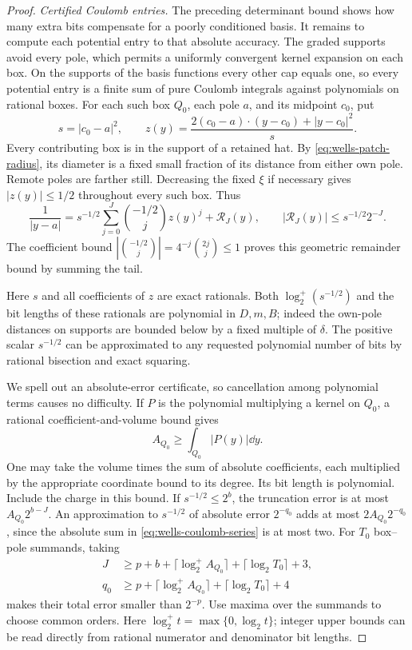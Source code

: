 \begin{proof}
\smallskip\noindent
\emph{Certified Coulomb entries.}
The preceding determinant bound shows how many extra bits compensate
for a poorly conditioned basis. It remains to compute each potential
entry to that absolute accuracy. The graded supports avoid every pole,
which permits a uniformly convergent kernel expansion on each box.
On the supports of the basis functions every other cap equals one,
so every potential entry is a finite sum of pure Coulomb integrals
against polynomials on rational boxes. For each such box \(Q_0\),
each pole \(a\), and its midpoint \(c_0\), put
\[
 s=|c_0-a|^2,\qquad
 z(y)=\frac{2(c_0-a)\cdot(y-c_0)+|y-c_0|^2}{s}.
\]
Every contributing box is in the support of a retained hat.
By \eqref{eq:wells-patch-radius}, its diameter is a fixed small
fraction of its distance from either own pole. Remote poles are
farther still. Decreasing the fixed \(\xi\) if necessary gives
\(|z(y)|\le1/2\) throughout every such box. Thus
\begin{equation}
 \frac1{|y-a|}
 =s^{-1/2}\sum_{j=0}^J\binom{-1/2}{j}z(y)^j
       +\mathcal R_J(y),\qquad
 |\mathcal R_J(y)|\le s^{-1/2}2^{-J}.
 \label{eq:wells-coulomb-series}
\end{equation}
The coefficient bound
\(\left|\binom{-1/2}{j}\right|
 =4^{-j}\binom{2j}{j}\le1\)
proves this geometric remainder bound by summing the tail.

Here \(s\) and all coefficients of \(z\) are exact rationals.
Both \(\log_2^+(s^{-1/2})\) and the bit lengths of these rationals are
polynomial in \(D,m,B\); indeed the own-pole distances on supports
are bounded below by a fixed multiple of \(\delta\).
The positive scalar \(s^{-1/2}\) can be approximated to any requested
polynomial number of bits by rational bisection and exact squaring.

We spell out an absolute-error certificate, so cancellation among
polynomial terms causes no difficulty. If \(P\) is the polynomial
multiplying a kernel on \(Q_0\), a rational coefficient-and-volume
bound gives
\[
 A_{Q_0}\ge\int_{Q_0}|P(y)|\dd y.
\]
One may take the volume times the sum of absolute coefficients,
each multiplied by the appropriate coordinate bound to its degree.
Its bit length is polynomial. Include the charge in this bound.
If \(s^{-1/2}\le2^b\), the truncation error is at most
\(A_{Q_0}2^{b-J}\). An approximation to \(s^{-1/2}\) of absolute
error \(2^{-q_0}\) adds at most \(2A_{Q_0}2^{-q_0}\), since the
absolute sum in \eqref{eq:wells-coulomb-series} is at most two.
For \(T_0\) box--pole summands, taking
\begin{align*}
 J&\ge p+b+\lceil\log_2^+ A_{Q_0}\rceil
                         +\lceil\log_2 T_0\rceil+3,\\
 q_0&\ge p+\lceil\log_2^+ A_{Q_0}\rceil
                         +\lceil\log_2 T_0\rceil+4
\end{align*}
makes their total error smaller than \(2^{-p}\).
Use maxima over the summands to choose common orders.
Here \(\log_2^+t=\max\{0,\log_2t\}\); integer upper bounds can be
read directly from rational numerator and denominator bit lengths.


\end{proof}
